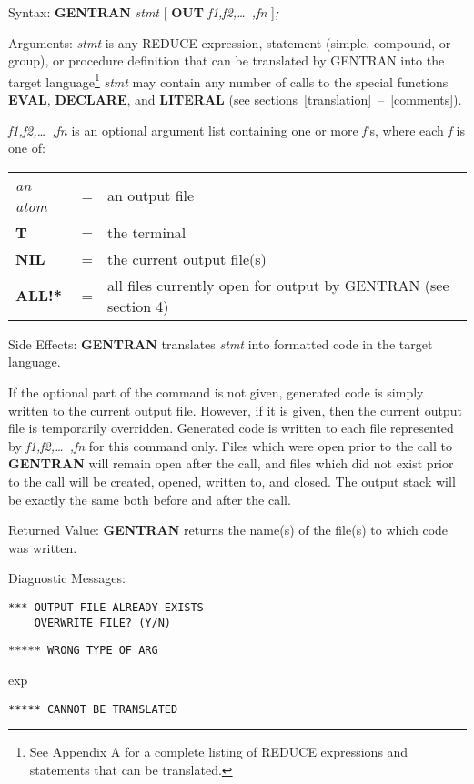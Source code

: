 \begin{describe}{Syntax:}
{\bf GENTRAN} {\it stmt} [ {\bf OUT} {\it f1,f2,\dots\  ,fn} ]{\it ;}
\end{describe}
\begin{describe}{Arguments:}
{\it stmt} is any REDUCE expression, statement (simple, compound, or
group), or procedure definition that can be translated by GENTRAN into the
target language\footnote{See Appendix A for a complete listing of REDUCE
expressions and statements that can be translated.}
{\it stmt} may contain any number of calls
to the special functions {\bf EVAL}, {\bf DECLARE}, and {\bf LITERAL}
(see sections~\ref{translation}~--~\ref{comments}).

{\it f1,f2,\dots\  ,fn } is an optional argument list containing one or more
{\it f}'s, where each {\it f} is one of:
\par
\begin{tabular}{lll}
{\it an atom} &= &an output file\\
{\bf T} &= &the terminal\\
{\bf NIL} &= &the current output file(s)\\
{\bf ALL!*} &= &all files currently open for output by GENTRAN (see section 4)\\
\end{tabular}
\end{describe}
\begin{describe}{Side Effects:}
{\bf GENTRAN} translates {\it stmt} into formatted code in the target language.

If the optional part of the command is not given, generated code is simply
written to the current output file.  However, if it is
given, then the current output file is temporarily overridden.  Generated
code is written to each file represented by 
{\it f1,f2,\dots\  ,fn} for this command only.  Files which were open prior to the
call to {\bf GENTRAN} will remain open after the call, and files which
did not exist prior to the call will be created, opened, written to,
and closed.  The output stack will be exactly the same both before and
after the call.
\end{describe}
\begin{describe}{Returned Value:}
{\bf GENTRAN}  returns the name(s) of the file(s) to which code was written.
\end{describe}
\begin{describe}{Diagnostic Messages:}
\begin{verbatim}
*** OUTPUT FILE ALREADY EXISTS
    OVERWRITE FILE? (Y/N)
\end{verbatim}
\begin{verbatim}
***** WRONG TYPE OF ARG
\end{verbatim}
exp
\begin{verbatim}
***** CANNOT BE TRANSLATED
\end{verbatim}
\end{describe}
